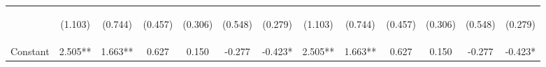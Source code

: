 \documentclass[]{article}
\begin{document}
\begin{center}
\begin{tabular}{lcccccccccccc}
\vspace{4pt} & \begin{footnotesize}(1.103)\end{footnotesize} & \begin{footnotesize}(0.744)\end{footnotesize} & \begin{footnotesize}(0.457)\end{footnotesize} & \begin{footnotesize}(0.306)\end{footnotesize} & \begin{footnotesize}(0.548)\end{footnotesize} & \begin{footnotesize}(0.279)\end{footnotesize} & \begin{footnotesize}(1.103)\end{footnotesize} & \begin{footnotesize}(0.744)\end{footnotesize} & \begin{footnotesize}(0.457)\end{footnotesize} & \begin{footnotesize}(0.306)\end{footnotesize} & \begin{footnotesize}(0.548)\end{footnotesize} & \begin{footnotesize}(0.279)\end{footnotesize} \\
Constant & 2.505** & 1.663** & 0.627 & 0.150 & -0.277 & -0.423* & 2.505** & 1.663** & 0.627 & 0.150 & -0.277 & -0.423* \\

\end{tabular}
\end{center}
\end{document}
